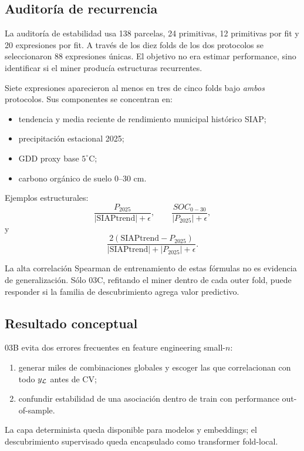 \subsection{Auditoría de recurrencia}

La auditoría de estabilidad usa 138 parcelas, 24 primitivas, 12 primitivas por fit y 20
expresiones por fit. A través de los diez folds de los dos protocolos se seleccionaron 88
expresiones únicas. El objetivo no era estimar performance, sino identificar si el miner
producía estructuras recurrentes.

Siete expresiones aparecieron al menos en tres de cinco folds bajo \emph{ambos} protocolos.
Sus componentes se concentran en:
\begin{itemize}
\item tendencia y media reciente de rendimiento municipal histórico SIAP;
\item precipitación estacional 2025;
\item GDD proxy base $5^\circ$C;
\item carbono orgánico de suelo 0--30 cm.
\end{itemize}

Ejemplos estructurales:
\[
\frac{P_{2025}}
{|\mathrm{SIAPtrend}|+\epsilon},
\qquad
\frac{SOC_{0-30}}
{|P_{2025}|+\epsilon},
\]
y
\[
\frac{2(\mathrm{SIAPtrend}-P_{2025})}
{|\mathrm{SIAPtrend}|+|P_{2025}|+\epsilon}.
\]

La alta correlación Spearman de entrenamiento de estas fórmulas no es evidencia de
generalización. Sólo 03C, refitando el miner dentro de cada outer fold, puede responder si la
familia de descubrimiento agrega valor predictivo.

\subsection{Resultado conceptual}

03B evita dos errores frecuentes en feature engineering small-$n$:
\begin{enumerate}
\item generar miles de combinaciones globales y escoger las que correlacionan con todo
$y_{\mathcal{L}}$ antes de CV;
\item confundir estabilidad de una asociación dentro de train con performance out-of-sample.
\end{enumerate}
La capa determinista queda disponible para modelos y embeddings; el descubrimiento supervisado
queda encapsulado como transformer fold-local.
